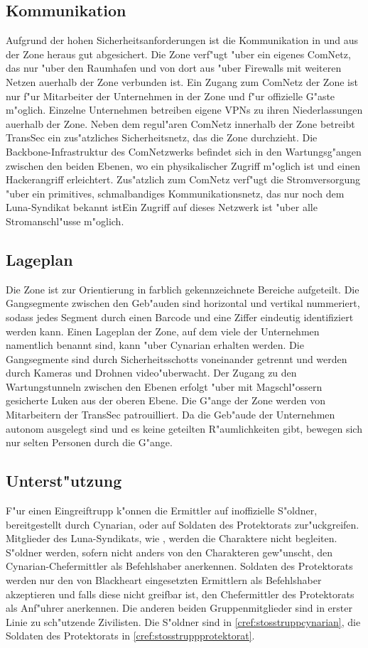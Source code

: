 \subsection{Kommunikation}
Aufgrund der hohen Sicherheitsanforderungen ist die Kommunikation in und aus der Zone heraus gut abgesichert. Die Zone verf"ugt "uber ein eigenes ComNetz, das nur "uber den Raumhafen und von dort aus "uber Firewalls mit weiteren Netzen au\3erhalb der Zone verbunden ist. Ein Zugang zum ComNetz der Zone ist nur f"ur Mitarbeiter der Unternehmen in der Zone und f"ur offizielle G"aste m"oglich. Einzelne Unternehmen betreiben eigene VPNs zu ihren Niederlassungen au\3erhalb der Zone. Neben dem regul"aren ComNetz innerhalb der Zone betreibt TransSec ein zus"atzliches Sicherheitsnetz, das die Zone durchzieht. Die Backbone-Infrastruktur des ComNetzwerks befindet sich in den Wartungsg"angen zwischen den beiden Ebenen, wo ein physikalischer Zugriff m"oglich ist und einen Hackerangriff erleichtert. Zus"atzlich zum ComNetz verf"ugt die Stromversorgung "uber ein primitives, schmalbandiges Kommunikationsnetz, das nur noch dem Luna-Syndikat bekannt istEin Zugriff auf dieses Netzwerk ist "uber alle Stromanschl"usse m"oglich.

\subsection{Lageplan} 
Die Zone ist zur Orientierung in farblich gekennzeichnete Bereiche aufgeteilt. Die Gangsegmente zwischen den Geb"auden sind horizontal und vertikal nummeriert, sodass jedes Segment durch einen Barcode und eine Ziffer eindeutig identifiziert werden kann. Einen Lageplan der Zone, auf dem viele der Unternehmen namentlich benannt sind, kann "uber Cynarian erhalten werden. Die Gangsegmente sind durch Sicherheitsschotts voneinander getrennt und werden durch Kameras und Drohnen video"uberwacht. Der Zugang zu den Wartungstunneln zwischen den Ebenen erfolgt "uber mit Magschl"ossern gesicherte Luken aus der oberen Ebene. Die G"ange der Zone werden von Mitarbeitern der TransSec patrouilliert. Da die Geb"aude der Unternehmen autonom ausgelegt sind und es keine geteilten R"aumlichkeiten gibt, bewegen sich nur selten Personen durch die G"ange.

\subsection{Unterst"utzung} 
F"ur einen Eingreiftrupp k"onnen die Ermittler auf inoffizielle S"oldner, bereitgestellt durch Cynarian, oder auf Soldaten des Protektorats zur"uckgreifen. Mitglieder des Luna-Syndikats, wie \xl{}, werden die Charaktere nicht begleiten. S"oldner werden, sofern nicht anders von den Charakteren gew"unscht, den Cynarian-Chefermittler als Befehlshaber anerkennen. Soldaten des Protektorats werden nur den von Blackheart eingesetzten Ermittlern als Befehlshaber akzeptieren und falls diese nicht greifbar ist, den Chefermittler des Protektorats als Anf"uhrer anerkennen. Die anderen beiden Gruppenmitglieder sind in erster Linie zu sch"utzende Zivilisten. Die S"oldner sind in \cref{cref:stosstruppcynarian}, die Soldaten des Protektorats in \cref{cref:stosstruppprotektorat}.

